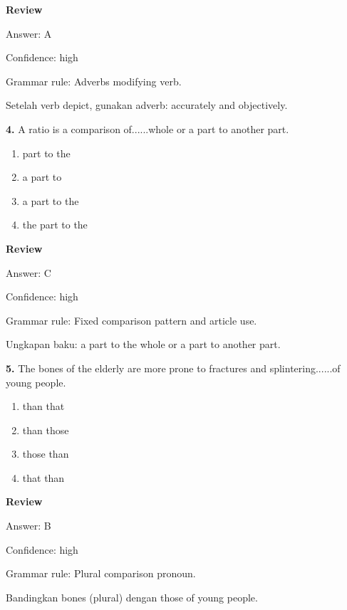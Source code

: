 \documentclass[12pt]{article}
\begin{document}
\par
\begingroup
\setlength{\parskip}{0pt}
\setlength{\parindent}{0pt}
\textbf{Review}\par
Answer: A\par
Confidence: high\par
Grammar rule: Adverbs modifying verb.\par
Setelah verb depict, gunakan adverb: accurately and objectively.\par
\endgroup
\par
\vspace{0.25\baselineskip}
\noindent\textbf{4.} A ratio is a comparison of......whole or a part to another part.
\begin{enumerate}[label=(\Alph*),leftmargin=*,itemsep=0.2em]
\item part to the
\item a part to
\item a part to the
\item the part to the
\end{enumerate}
\par
\begingroup
\setlength{\parskip}{0pt}
\setlength{\parindent}{0pt}
\textbf{Review}\par
Answer: C\par
Confidence: high\par
Grammar rule: Fixed comparison pattern and article use.\par
Ungkapan baku: a part to the whole or a part to another part.\par
\endgroup
\par
\vspace{0.25\baselineskip}
\noindent\textbf{5.} The bones of the elderly are more prone to fractures and splintering......of young people.
\begin{enumerate}[label=(\Alph*),leftmargin=*,itemsep=0.2em]
\item than that
\item than those
\item those than
\item that than
\end{enumerate}
\par
\begingroup
\setlength{\parskip}{0pt}
\setlength{\parindent}{0pt}
\textbf{Review}\par
Answer: B\par
Confidence: high\par
Grammar rule: Plural comparison pronoun.\par
Bandingkan bones (plural) dengan those of young people.\par
\end{document}
